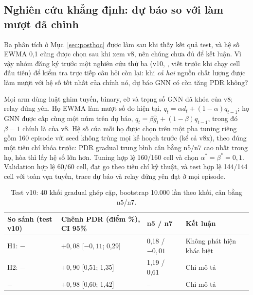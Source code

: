 \subsection{Nghiên cứu khẳng định: dự báo so với làm mượt đã chỉnh}\label{sec:v10}
Ba phân tích ở Mục~\ref{sec:posthoc} được làm sau khi thấy kết quả test, và hệ
số EWMA 0,1 cũng được chọn sau khi xem v8, nên chúng chưa đủ để kết luận. Vì
vậy nhóm đăng ký trước một nghiên cứu thứ ba (v10, ,
viết trước khi chạy cell đầu tiên) để kiểm tra trực tiếp câu hỏi còn lại: khi
\emph{cả hai} nguồn chất lượng được làm mượt với hệ số tốt nhất của chính nó,
dự báo GNN có còn tăng PDR không?

Mọi arm dùng luật ghim tuyến, binary, cờ và trọng số GNN đã khóa của v8; relay
đứng yên. Họ EWMA làm mượt số đo hiện tại, $q_t=\alpha d_t+(1-\alpha)q_{t-1}$;
họ GNN được cấp cùng một núm trên dự báo, $q_t=\beta\hat g_t+(1-\beta)q_{t-1}$,
trong đó $\beta=1$ chính là  của v8. Hệ số của mỗi họ được chọn
trên một pha tuning riêng gồm 160 episode với seed không trùng mọi kế hoạch
trước (kể cả v8x), theo đúng một tiêu chí khóa trước: PDR gradual trung bình
cân bằng n5/n7 cao nhất trong họ, hòa thì lấy hệ số lớn hơn. Tuning hợp lệ
160/160 cell và chọn $\alpha^\ast=\beta^\ast=0{,}1$. Validation hợp lệ 60/60
cell, đạt go theo tiêu chí kỹ thuật, và test hợp lệ 144/144 cell với toàn vẹn
tuyến, trace dự báo và relay đứng yên đạt ở mọi episode.

\begin{table}[htbp]
\centering\small
\begin{tabularx}{\linewidth}{@{}Yp{3.4cm}p{1.9cm}p{2.6cm}@{}}
\toprule
\textbf{So sánh (test v10)}&\textbf{Chênh PDR (điểm \%), CI 95\%}&\textbf{n5 / n7}&\textbf{Kết luận}\\\midrule
H1:  $-$ &$+0{,}08$ [$-0{,}11$; 0,29]&0,18 / $-0{,}01$&Không phát hiện khác biệt\\
H2:  $-$ &$+0{,}90$ [0,51; 1,35]&1,19 / 0,61&Chỉ mô tả\\
 $-$ &$+0{,}98$ [0,60; 1,42]&--&Chỉ mô tả\\
\bottomrule
\end{tabularx}
\caption{Test v10: 40 khối gradual ghép cặp, bootstrap 10.000 lần theo khối, cân bằng n5/n7.}\label{tab:v10test}
\end{table}


